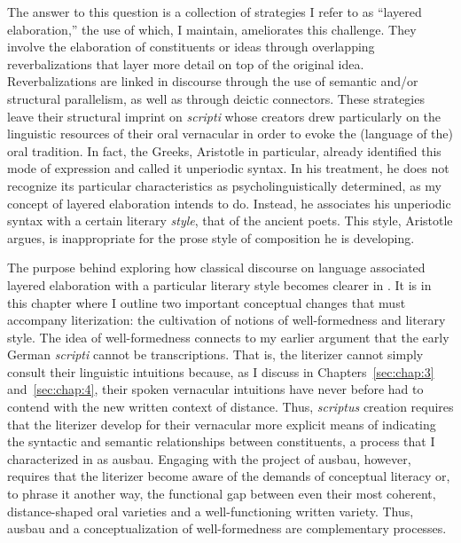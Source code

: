 The answer to this question is a collection of strategies I refer to as “layered elaboration,” the use of which, I maintain, ameliorates this challenge. They involve the elaboration of constituents or ideas through overlapping reverbalizations that layer more detail on top of the original idea. Reverbalizations are linked in discourse through the use of semantic and/or structural parallelism, as well as through deictic connectors. These strategies leave their structural imprint on \textit{scripti} whose creators drew particularly on the linguistic resources of their oral vernacular in order to evoke the (language of the) oral tradition. In fact, the Greeks, Aristotle in particular, already identified this mode of expression and called it unperiodic syntax. In his treatment, he does not recognize its particular characteristics as psycholinguistically determined, as my concept of layered elaboration intends to do. Instead, he associates his unperiodic syntax with a certain literary \textit{style}, that of the ancient poets. This style, Aristotle argues, is inappropriate for the prose style of composition he is developing. 

The purpose behind exploring how classical discourse on language associated layered elaboration with a particular literary style becomes clearer in . It is in this chapter where I outline two important conceptual changes that must accompany literization: the cultivation of notions of well-formedness and literary style. The idea of well-formedness connects to my earlier argument that the early German \textit{scripti} cannot be transcriptions. That is, the literizer cannot simply consult their linguistic intuitions because, as I discuss in Chapters~\ref{sec:chap:3} and~\ref{sec:chap:4}, their spoken vernacular intuitions have never before had to contend with the new written context of distance. Thus, \textit{scriptus} creation requires that the literizer develop for their vernacular more explicit means of indicating the syntactic and semantic relationships between constituents, a process that I characterized in  as ausbau. Engaging with the project of ausbau, however, requires that the literizer become aware of the demands of conceptual literacy or, to phrase it another way, the functional gap between even their most coherent, distance-shaped oral varieties and a well-functioning written variety. Thus, ausbau and a conceptualization of well-formedness are complementary processes.

